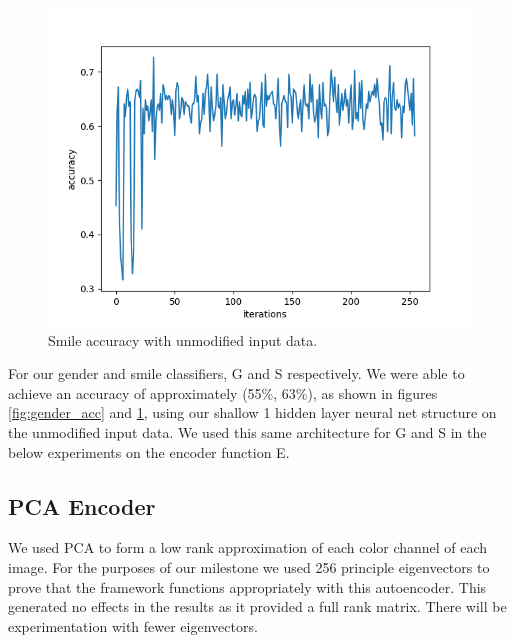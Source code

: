 \documentclass[10pt,twocolumn,letterpaper]{article}
\begin{document}
\begin{figure}[h]
\includegraphics[width=\columnwidth]{smile_acc.png}
\centering
\caption{Smile accuracy with unmodified input data.}
\label{fig:smile_acc}
\end{figure}

For our gender and smile classifiers, G and S respectively. We were able to achieve an accuracy of approximately (55\%, 63\%), as shown in figures \ref{fig:gender_acc} and \ref{fig:smile_acc}, using our shallow 1 hidden layer neural net structure on the unmodified input data. We used this same architecture for G and S in the below experiments on the encoder function E.

\subsection{PCA Encoder}
We used PCA to form a low rank approximation of each color channel of each image. For the purposes of our milestone we used 256 principle eigenvectors to prove that the framework functions appropriately with this autoencoder. This generated no effects in the results as it provided a full rank matrix. There will be experimentation with fewer eigenvectors. 


\end{document}
